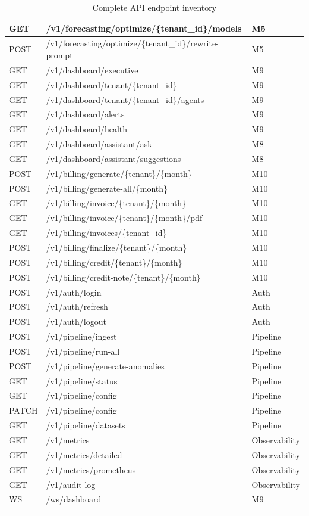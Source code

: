 \documentclass[12pt,a4paper,twoside]{report}
\begin{document}
\begin{longtable}{|l|l|l|}
\hline
GET & /v1/forecasting/optimize/\{tenant\_id\}/models & M5 \\
\hline
POST & /v1/forecasting/optimize/\{tenant\_id\}/rewrite-prompt & M5 \\
\hline
GET & /v1/dashboard/executive & M9 \\
\hline
GET & /v1/dashboard/tenant/\{tenant\_id\} & M9 \\
\hline
GET & /v1/dashboard/tenant/\{tenant\_id\}/agents & M9 \\
\hline
GET & /v1/dashboard/alerts & M9 \\
\hline
GET & /v1/dashboard/health & M9 \\
\hline
GET & /v1/dashboard/assistant/ask & M8 \\
\hline
GET & /v1/dashboard/assistant/suggestions & M8 \\
\hline
POST & /v1/billing/generate/\{tenant\}/\{month\} & M10 \\
\hline
POST & /v1/billing/generate-all/\{month\} & M10 \\
\hline
GET & /v1/billing/invoice/\{tenant\}/\{month\} & M10 \\
\hline
GET & /v1/billing/invoice/\{tenant\}/\{month\}/pdf & M10 \\
\hline
GET & /v1/billing/invoices/\{tenant\_id\} & M10 \\
\hline
POST & /v1/billing/finalize/\{tenant\}/\{month\} & M10 \\
\hline
POST & /v1/billing/credit/\{tenant\}/\{month\} & M10 \\
\hline
POST & /v1/billing/credit-note/\{tenant\}/\{month\} & M10 \\
\hline
POST & /v1/auth/login & Auth \\
\hline
POST & /v1/auth/refresh & Auth \\
\hline
POST & /v1/auth/logout & Auth \\
\hline
POST & /v1/pipeline/ingest & Pipeline \\
\hline
POST & /v1/pipeline/run-all & Pipeline \\
\hline
POST & /v1/pipeline/generate-anomalies & Pipeline \\
\hline
GET & /v1/pipeline/status & Pipeline \\
\hline
GET & /v1/pipeline/config & Pipeline \\
\hline
PATCH & /v1/pipeline/config & Pipeline \\
\hline
GET & /v1/pipeline/datasets & Pipeline \\
\hline
GET & /v1/metrics & Observability \\
\hline
GET & /v1/metrics/detailed & Observability \\
\hline
GET & /v1/metrics/prometheus & Observability \\
\hline
GET & /v1/audit-log & Observability \\
\hline
WS & /ws/dashboard & M9 \\
\hline

\caption{Complete API endpoint inventory}
\label{tab:endpoints}
\end{longtable}
\end{document}
